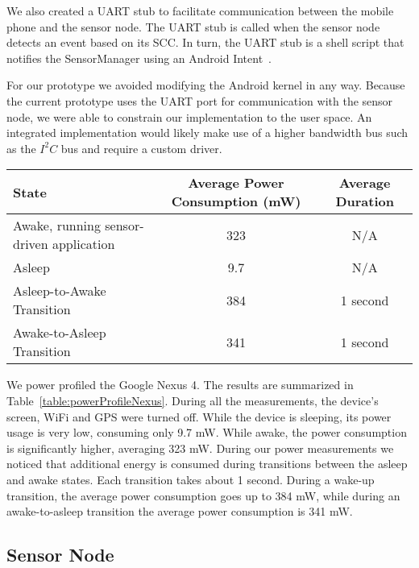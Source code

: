 We also created a UART stub to facilitate communication between the
mobile phone and the sensor node. The UART stub is called when
the sensor node detects an event based on its SCC.
In turn, the UART stub is a shell script that notifies the
SensorManager using an Android Intent~\cite{androidintents}.

For our prototype we avoided modifying the Android kernel in any way.
Because the current prototype uses the UART port for communication
with the sensor node, we were able to constrain our implementation to
the user space.  An integrated implementation would likely make use of
a higher bandwidth bus such as the $I^2C$ bus and require a custom
driver.


\begin{table*}[t]
{\small
	\begin{tabular}{| p{7cm} | c | c |}
		\hline
		State 										& Average Power Consumption (mW) 		& Average Duration \\ \hline
		Awake, running sensor-driven application 	& 323 & N/A \\ \hline
		Asleep 										& 9.7 & N/A \\ \hline
		Asleep-to-Awake Transition 					& 384 & 1 second \\ \hline
		Awake-to-Asleep Transition 					& 341 & 1 second \\ \hline
	\end{tabular}
}
	\caption{Google Nexus 4 power profile. \hl{TODO: Improve formatting}}
	\label{table:powerProfileNexus}
\end{table*}

We power profiled the Google Nexus 4.  The results are summarized in
Table~\ref{table:powerProfileNexus}.  During all the measurements, the
device's screen, WiFi and GPS were turned off.  While the device is
sleeping, its power usage is very low, consuming only 9.7 mW.  While
awake, the power consumption is significantly higher, averaging 323
mW.  During our power measurements we noticed that additional energy is
consumed during transitions between the asleep and awake states.  Each
transition takes about 1 second.  During a wake-up transition, the
average power consumption goes up to 384 mW, while during an
awake-to-asleep transition the average power consumption is 341 mW.


\subsection{Sensor Node}
\label{subsec:sensorNode}

